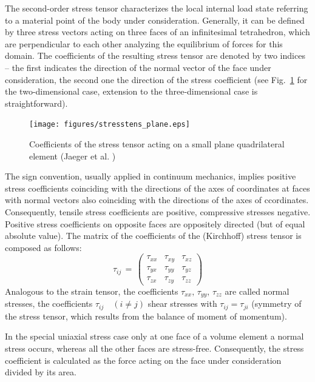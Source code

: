 The second-order stress tensor characterizes the local internal load state referring to a material point of the body under consideration. Generally, it can be defined by three stress vectors acting on three faces of an infinitesimal tetrahedron, which are perpendicular to each other analyzing the equilibrium of forces for this domain. The coefficients of the resulting stress tensor are denoted by two indices -- the first indicates the direction of the normal vector of the face under consideration, the second one the direction of the stress coefficient (see Fig.~\ref{fig:stresstens_plane} for the two-dimensional case, extension to the three-dimensional case is straightforward).


\begin{figure}[htb!]
\begin{center}
\footnotesize
\texttt{[image: figures/stresstens\_plane.eps]}
\caption{Coefficients of the stress tensor acting on a small plane quadrilateral element (Jaeger et al. \cite{JCZ:2007})}
\label{fig:stresstens_plane}
\end{center}
\end{figure}

The sign convention, usually applied in continuum mechanics, implies positive stress coefficients coinciding with the directions of the axes of coordinates at faces with normal vectors also coinciding with the directions of the axes of ccordinates. Consequently, tensile stress coefficients are positive, compressive stresses negative. Positive stress coefficients on opposite faces are oppositely directed (but of equal absolute value). The matrix of the coefficients of the (Kirchhoff) stress tensor is composed as follows:
\begin{equation}
\tau_{ij}\,=\,
\left(
\begin{array}{ccc}
\tau_{xx} & \tau_{xy} & \tau_{xz} \\
\tau_{yx} & \tau_{yy} & \tau_{yz} \\
\tau_{zx} & \tau_{zy} & \tau_{zz}
\end{array}
\right)
\label{eq:stress_matrix}
\end{equation}
Analogous to the strain tensor, the coefficients $\tau_{xx},\,\tau_{yy},\,\tau_{zz}$ are called normal stresses, the coefficients $\tau_{ij}\quad(i\neq j)$ shear stresses with $\tau_{ij}=\tau_{ji}$ (symmetry of the stress tensor, which results from the balance of moment of momentum).

In the special uniaxial stress case only at one face of a volume element a normal stress occurs, whereas all the other faces are stress-free. Consequently, the stress coefficient is calculated as the force acting on the face under consideration divided by its area.
